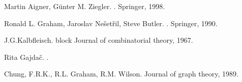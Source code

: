 \documentclass{article}
\theoremstyle{definition}
\begin{document}
		\newpage

	\begin{thebibliography}{99}
		Martin Aigner, Günter M. Ziegler.
		.
		\newblock Springer, 1998.

		Ronald L. Graham, Jaroslav Nešetřil, Steve Butler.
		.
		\newblock Springer, 1990.
		
		J.G.Kalbfleisch.
		\new block Journal of combinatorial theory, 1967.
		
		Rita Gajdač.
		.
		
		Chung, F.R.K., R.L. Graham, R.M. Wilson.
		\newblock Journal of graph theory, 1989.



	\end{thebibliography}	

	
\end{document}
